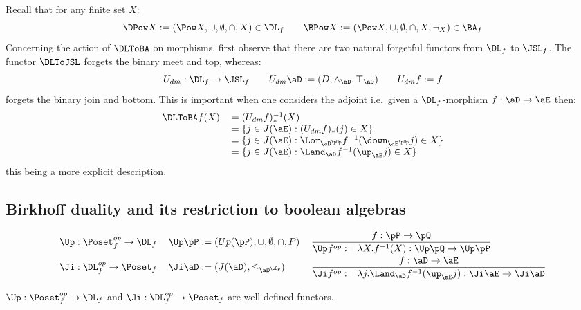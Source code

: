 \documentclass{article}
\begin{document}
\begin{note}
Recall that for any finite set $X$:
\[
\DPow X := (\Pow X,\cup,\emptyset,\cap,X) \in \DL_f
\qquad
\BPow X := (\Pow X,\cup,\emptyset,\cap,X,\neg_X) \in \BA_f
\]
Concerning the action of $\DLToBA$ on morphisms, first observe that there are two natural forgetful functors from $\DL_f$ to $\JSL_f$. The functor $\DLToJSL$ forgets the binary meet and top, whereas:
\[
U_{dm} : \DL_f \to \JSL_f
\qquad
U_{dm} \aD := (D,\land_\aD,\top_\aD)
\qquad
U_{dm} f := f
\]
forgets the binary join and bottom. This is important when one considers the adjoint i.e.\ given a $\DL_f$-morphism $f : \aD \to \aE$ then:
\[
\begin{tabular}{ll}
$\DLToBA f (X) $
& $= (U_{dm} f)_*^{-1}(X)$
\\&
$= \{ j \in J(\aE) : (U_{dm} f)_*(j) \in X \}$
\\&
$= \{ j \in J(\aE) : \Lor_{\aD^{\pOp}} f^{-1}(\down_{\aE^{\pOp}} j ) \in X \}$
\\&
$= \{ j \in J(\aE) : \Land_\aD f^{-1}(\up_\aE j ) \in X \}$
\end{tabular}
\]
this being a more explicit description. \endbox
\end{note}


\subsection{Birkhoff duality and its restriction to boolean algebras}

\begin{definition}
\[
\begin{tabular}{lll}
$\Up : \Poset_f^{op} \to \DL_f$
&
$\Up \pP := (Up(\pP),\cup,\emptyset,\cap,P)$
&
$\dfrac{f : \pP \to \pQ}{\Up f^{op} := \lambda X.f^{-1}(X): \Up\pQ \to \Up\pP}$
\\[2ex]
$\Ji : \DL_f^{op} \to \Poset_f$
&
$\Ji \aD := (J(\aD),\leq_{\aD^{\pOp}})$
&
$\dfrac{f : \aD \to \aE}{\Ji f^{op} := \lambda j.\Land_\aD f^{-1}(\up_\aE j) : \Ji\aE \to \Ji\aD}$
\end{tabular}
\]
\end{definition}


\begin{lemma}
\label{lem:birkhoff_funct_welldef}
$\Up : \Poset_f^{op} \to \DL_f$ and $\Ji : \DL_f^{op} \to \Poset_f$ are well-defined functors.
\end{lemma}
\end{document}
